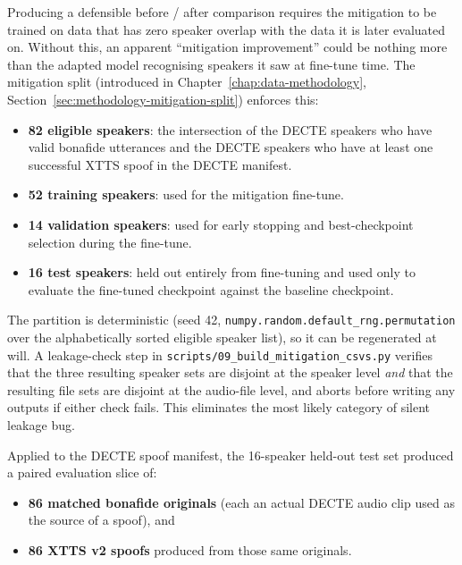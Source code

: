 Producing a defensible before / after comparison requires the
mitigation to be trained on data that has zero speaker overlap
with the data it is later evaluated on. Without this, an
apparent ``mitigation improvement'' could be nothing more than the
adapted model recognising speakers it saw at fine-tune time. The
mitigation split (introduced in Chapter~\ref{chap:data-methodology}, Section~\ref{sec:methodology-mitigation-split}) enforces
this:

\begin{itemize}
    \item \textbf{82 eligible speakers}: the intersection of the DECTE
        speakers who have valid bonafide utterances and the DECTE
        speakers who have at least one successful XTTS spoof in the
        DECTE manifest.
    \item \textbf{52 training speakers}: used for the mitigation fine-tune.
    \item \textbf{14 validation speakers}: used for early stopping and
        best-checkpoint selection during the fine-tune.
    \item \textbf{16 test speakers}: held out entirely from fine-tuning and
        used only to evaluate the fine-tuned checkpoint against the
        baseline checkpoint.
\end{itemize}

The partition is deterministic (seed 42, \texttt{numpy.random.}\allowbreak\texttt{default\_rng.}\allowbreak\texttt{permutation}
over the alphabetically sorted eligible speaker
list), so it can be regenerated at will. A leakage-check step in
\texttt{scripts/}\allowbreak\texttt{09\_build\_mitigation\_csvs.py} verifies that the three
resulting speaker sets are disjoint at the speaker level \emph{and}
that the resulting file sets are disjoint at the audio-file
level, and aborts before writing any outputs if either check
fails. This eliminates the most likely category of silent
leakage bug.

Applied to the DECTE spoof manifest, the 16-speaker held-out
test set produced a paired evaluation slice of:

\begin{itemize}
    \item \textbf{86 matched bonafide originals} (each an actual DECTE audio
        clip used as the source of a spoof), and
    \item \textbf{86 XTTS v2 spoofs} produced from those same originals.
\end{itemize}

